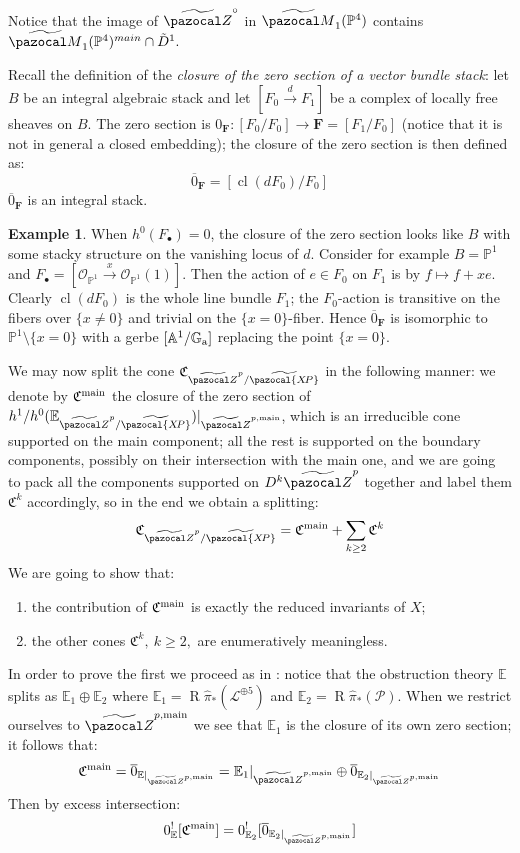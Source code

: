 \documentclass[11pt]{amsart}
\newcommand{\PP}{\mathbb P}
\newcommand{\OO}{\mathcal O}
\renewcommand{\to}{\rightarrow}
\newcommand{\Aaff}{\mathbb A}
\newcommand{\tXP}{\widetilde{\pazocal{X\!P}}}
\newcommand{\tZ}{\widetilde{\pazocal Z}}
\newcommand{\tZp}{\widetilde{\pazocal Z}^p}
\newcommand{\tM}{\widetilde{\pazocal M}}
\newcommand{\R}{\operatorname{R}}
\theoremstyle{plain}
\theoremstyle{definition}
\newtheorem{ex}[thm]{Example}
\begin{document}
 Notice that the image of $\tZ^{\circ}$ in $\tM_1(\PP^4)$ contains $\tM_1(\PP^4)^{main}\cap \tilde{D}^1.$

Recall the definition of the \emph{closure of the zero section of a vector bundle stack}: let $B$ be an integral algebraic stack and let $[F_0\xrightarrow{d} F_1]$ be a complex of locally free sheaves on $B$. The zero section is $0_{\mathbf F}\colon [F_0/F_0]\to\mathbf F=[F_1/F_0]$ (notice that it is not in general a closed embedding); the closure of the zero section is then defined as:
\[ \overline{0}_{\mathbf F}=[\operatorname{cl}(dF_0)/F_0] \]
$\overline{0}_{\mathbf F}$ is an integral stack.

\begin{ex}
When $h^0(F_\bullet)=0$, the closure of the zero section looks like $B$ with some stacky structure on the vanishing locus of $d$. Consider for example $B=\PP^1$ and $F_\bullet=[\OO_{\PP^1}\xrightarrow{x}\OO_{\PP^1}(1)]$. Then the action of $e\in F_0$ on $F_1$ is by $f\mapsto f+xe$. Clearly $\operatorname{cl}(dF_0)$ is the whole line bundle $F_1$; the $F_0$-action is transitive on the fibers over $\{x\neq 0\}$ and trivial on the $\{x=0\}$-fiber. Hence $\overline{0}_{\mathbf F}$ is isomorphic to $\PP^1\setminus\{x=0\}$ with a gerbe $[\Aaff^1/\mathbb G_{\rm a}]$ replacing the point $\{x=0\}$.
\end{ex}

We may now split the cone $\mathfrak{C}_{\tZp/\tXP}$ in the following manner: we denote by $\mathfrak C^{\rm{main}}$ the closure of the zero section of $h^1/h^0(\mathbb {E}_{\tZp/\tXP})\rvert_{\tZ^{p,\rm{main}}}$, which is an irreducible cone supported on the main component; all the rest is supported on the boundary components, possibly on their intersection with the main one, and we are going to pack all the components supported on $D^k\tZp$ together and label them $\mathfrak C^k$ accordingly, so in the end we obtain a splitting:
\[
 \mathfrak{C}_{\tZp/\tXP}=\mathfrak C^{\rm{main}}+\sum_{k\geq 2} \mathfrak C^k
\]
We are going to show that:
\begin{enumerate}
 \item the contribution of $\mathfrak C^{\rm{main}}$ is exactly the reduced invariants of $X$;
 \item the other cones $\mathfrak C^k,\ k\geq 2,$ are enumeratively meaningless.
\end{enumerate}

In order to prove the first we proceed as in \cite[\S5]{CLpfields}: notice that the obstruction theory $\mathbb E$ splits as $\mathbb E_1\oplus\mathbb E_2$ where $\mathbb E_1=\R\hat\pi_*(\mathcal L^{\oplus 5})$ and $\mathbb E_2=\R\hat\pi_*(\mathcal P)$. When we restrict ourselves to $\tZ^{p,\rm{main}}$ we see that $\mathbb E_1$ is the closure of its own zero section; it follows that:
\[
 \mathfrak C^{\rm{main}}=\overline{0}_{\mathbb E\rvert_{\tZ^{p,\rm{main}}}}=\mathbb E_1\rvert_{\tZ^{p,\rm{main}}}\oplus \overline{0}_{\mathbb E_2\rvert_{\tZ^{p,\rm{main}}}}
\]
Then by excess intersection:
\[
 0^!_{\mathbb E}[\mathfrak C^{\rm{main}}]=0_{\mathbb E_2}^![\overline{0}_{\mathbb E_2\rvert_{\tZ^{p,\rm{main}}}}]
\]
\end{document}
